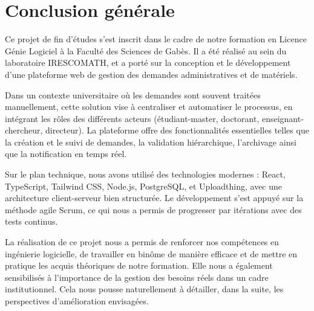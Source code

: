 \chapter*{Conclusion générale}

Ce projet de fin d’études s’est inscrit dans le cadre de notre formation en Licence Génie Logiciel à la Faculté des Sciences de Gabès. Il a été réalisé au sein du laboratoire IRESCOMATH, et a porté sur la conception et le développement d’une plateforme web de gestion des demandes administratives et de matériels.

Dans un contexte universitaire où les demandes sont souvent traitées manuellement, cette solution vise à centraliser et automatiser le processus, en intégrant les rôles des différents acteurs (étudiant-master, doctorant, enseignant-chercheur, directeur). La plateforme offre des fonctionnalités essentielles telles que la création et le suivi de demandes, la validation hiérarchique, l’archivage ainsi que la notification en temps réel.

Sur le plan technique, nous avons utilisé des technologies modernes : React, TypeScript, Tailwind CSS, Node.js, PostgreSQL, et Uploadthing, avec une architecture client-serveur bien structurée. Le développement s’est appuyé sur la méthode agile Scrum, ce qui nous a permis de progresser par itérations avec des tests continus.

La réalisation de ce projet nous a permis de renforcer nos compétences en ingénierie logicielle, de travailler en binôme de manière efficace et de mettre en pratique les acquis théoriques de notre formation. Elle nous a également sensibilisés à l’importance de la gestion des besoins réels dans un cadre institutionnel. Cela nous pousse naturellement à détailler, dans la suite, les perspectives d’amélioration envisagées.

\bigskip

